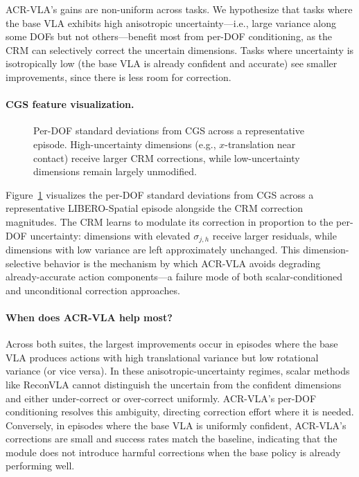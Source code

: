 ACR-VLA's gains are non-uniform across tasks.
We hypothesize that tasks where the base VLA exhibits high anisotropic uncertainty---i.e., large variance along some DOFs but not others---benefit most from per-DOF conditioning, as the CRM can selectively correct the uncertain dimensions.
Tasks where uncertainty is isotropically low (the base VLA is already confident and accurate) see smaller improvements, since there is less room for correction.

\paragraph{CGS feature visualization.}

\begin{figure}[t]
\centering
\caption{Per-DOF standard deviations from CGS across a representative episode. High-uncertainty dimensions (e.g., $x$-translation near contact) receive larger CRM corrections, while low-uncertainty dimensions remain largely unmodified.}
\label{fig:cgs_vis}
\end{figure}

Figure~\ref{fig:cgs_vis} visualizes the per-DOF standard deviations from CGS across a representative LIBERO-Spatial episode alongside the CRM correction magnitudes.
The CRM learns to modulate its correction in proportion to the per-DOF uncertainty: dimensions with elevated $\sigma_{j,h}$ receive larger residuals, while dimensions with low variance are left approximately unchanged.
This dimension-selective behavior is the mechanism by which ACR-VLA avoids degrading already-accurate action components---a failure mode of both scalar-conditioned and unconditional correction approaches.

\paragraph{When does ACR-VLA help most?}
Across both suites, the largest improvements occur in episodes where the base VLA produces actions with high translational variance but low rotational variance (or vice versa).
In these anisotropic-uncertainty regimes, scalar methods like ReconVLA cannot distinguish the uncertain from the confident dimensions and either under-correct or over-correct uniformly.
ACR-VLA's per-DOF conditioning resolves this ambiguity, directing correction effort where it is needed.
Conversely, in episodes where the base VLA is uniformly confident, ACR-VLA's corrections are small and success rates match the baseline, indicating that the module does not introduce harmful corrections when the base policy is already performing well.
